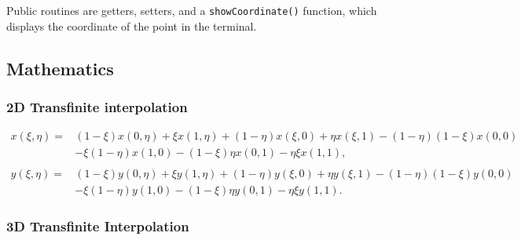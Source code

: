 \documentclass{article}
\newcommand{\ba}[1]{\begin{align*}    #1    \end{align*}}
\begin{document}
Public routines are getters, setters, and a \texttt{showCoordinate()} function, which displays the coordinate of the point in the terminal.

\subsection{Mathematics}
\label{sec:Mathematics}

\subsubsection{2D Transfinite interpolation}
\label{sec:2Dtfi}

\ba{
x(\xi,\eta) = &(1-\xi)x(0,\eta)+\xi x(1,\eta)+(1-\eta)x(\xi,0)+\eta x(\xi,1)-(1-\eta)(1-\xi)x(0,0)
\\&-\xi(1-\eta)x(1,0)-(1-\xi)\eta x(0,1)-\eta \xi x(1,1),\\
\\y(\xi, \eta) = &(1-\xi)y(0,\eta)+\xi y(1,\eta)+(1-\eta)y(\xi,0)+\eta y(\xi,1)-(1-\eta)(1-\xi)y(0,0)
\\&-\xi(1-\eta)y(1,0)-(1-\xi)\eta y(0,1)-\eta \xi y(1,1).
}

\subsubsection{3D Transfinite Interpolation}
\label{sec:3Dtfi}
\end{document}
